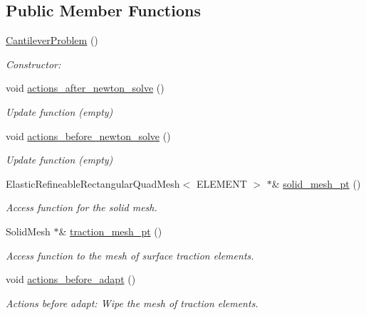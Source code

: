 \subsection*{Public Member Functions}
\begin{DoxyCompactItemize}
\item 
\hyperlink{classCantileverProblem_abba97fc4b8402bc0363fdf16322f6572}{Cantilever\+Problem} ()
\begin{DoxyCompactList}\small\item\em Constructor\+: \end{DoxyCompactList}\item 
void \hyperlink{classCantileverProblem_a4a70a4328d287aaa15c7811562122013}{actions\+\_\+after\+\_\+newton\+\_\+solve} ()
\begin{DoxyCompactList}\small\item\em Update function (empty) \end{DoxyCompactList}\item 
void \hyperlink{classCantileverProblem_a293902b825898ce043ffce3f0691f5a5}{actions\+\_\+before\+\_\+newton\+\_\+solve} ()
\begin{DoxyCompactList}\small\item\em Update function (empty) \end{DoxyCompactList}\item 
Elastic\+Refineable\+Rectangular\+Quad\+Mesh$<$ E\+L\+E\+M\+E\+NT $>$ $\ast$\& \hyperlink{classCantileverProblem_a26843782873897ee5e45647d17204b86}{solid\+\_\+mesh\+\_\+pt} ()
\begin{DoxyCompactList}\small\item\em Access function for the solid mesh. \end{DoxyCompactList}\item 
Solid\+Mesh $\ast$\& \hyperlink{classCantileverProblem_af9e9b4a4686ac29bc7e4ef5d6baeae5a}{traction\+\_\+mesh\+\_\+pt} ()
\begin{DoxyCompactList}\small\item\em Access function to the mesh of surface traction elements. \end{DoxyCompactList}\item 
void \hyperlink{classCantileverProblem_a50f8964219c507562945655e0ed5fc23}{actions\+\_\+before\+\_\+adapt} ()
\begin{DoxyCompactList}\small\item\em Actions before adapt\+: Wipe the mesh of traction elements. \end{DoxyCompactList}\item 

\end{DoxyCompactItemize}
